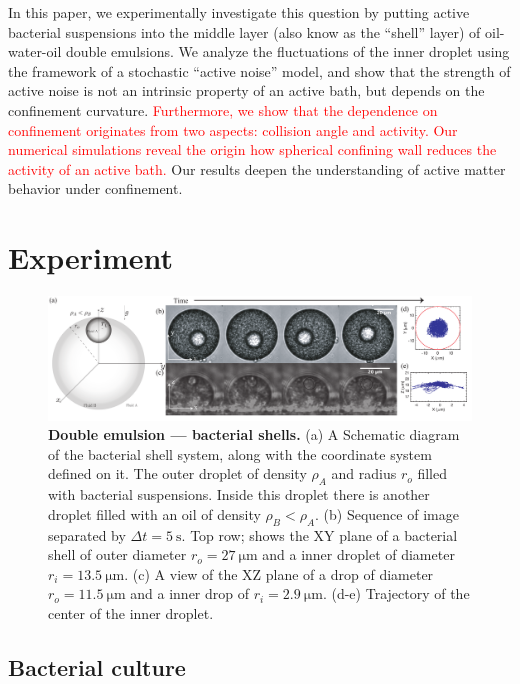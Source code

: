 \documentclass[%
10pt,
superscriptaddress,
twocolumn,
 amsmath,amssymb,
 aps,prx,
]{revtex4-2}
\begin{document}
In this paper, we experimentally investigate this question by putting active bacterial suspensions into the middle layer (also know as the ``shell'' layer) of oil-water-oil double emulsions.
We analyze the fluctuations of the inner droplet using the framework of a stochastic ``active noise'' model, and show that the strength of active noise is not an intrinsic property of an active bath, but depends on the confinement curvature.
\textcolor{red}{Furthermore, we show that the dependence on confinement originates from two aspects: collision angle and activity. Our numerical simulations reveal the origin how spherical confining wall reduces the activity of an active bath.}
Our results deepen the understanding of active matter behavior under confinement.

\section{Experiment}

\begin{figure}[!t]
  \includegraphics[width=\textwidth]{Diagrama_DE}
  \caption{
  \textbf{Double emulsion --- bacterial shells.}
  (a) A Schematic diagram of the bacterial shell system, along with the coordinate system defined on it.
  The outer droplet of density $\rho_A$ and radius $r_o$ filled with bacterial suspensions.
  Inside this droplet there is another droplet filled with an oil of density $\rho_B < \rho_A$.
  (b) Sequence of image separated by $\Delta t =\SI{5}{\second}$. Top row; shows the XY plane of a bacterial shell of outer diameter $r_o=\SI{27}{\micro\meter}$ and a inner droplet of diameter $r_i=\SI{13.5}{\micro\meter}$.
  (c) A view of the XZ plane of a drop of diameter $r_o=\SI{11.5}{\micro\meter}$ and a inner drop of $r_i=\SI{2.9}{\micro\meter}$.
  (d-e) Trajectory of the center of the inner droplet.
  }
  \label{montaje_doble}
\end{figure}

\subsection{Bacterial culture}
\end{document}
